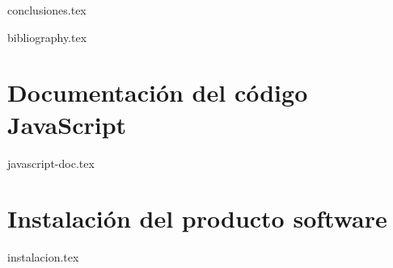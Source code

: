 \documentclass[twoside,openright,11pt]{report}
\begin{document}
{conclusiones.tex}

{bibliography.tex}


\appendix
\cleardoublepage
{}


\chapter{Documentación del código JavaScript}
\label{appendix:javascript}

{javascript-doc.tex}

\chapter{Instalación del producto software}
\label{appendix:instalacion}

{instalacion.tex}
\end{document}
